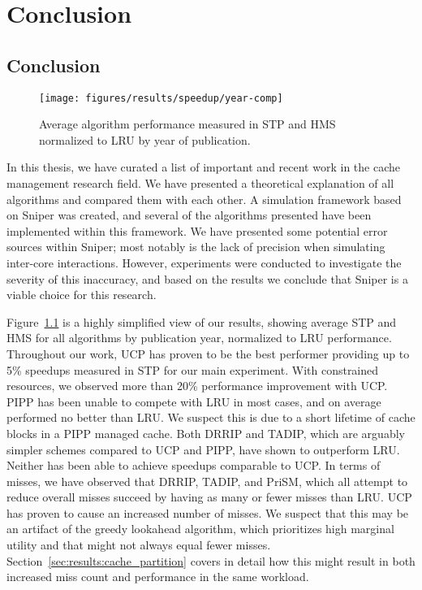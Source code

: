 
\chapter{Conclusion}
\label{cpt:conclusion}

\section{Conclusion}

\begin{figure}[ht]
    \centering
    \texttt{[image: figures/results/speedup/year-comp]}
    \caption[Average algorithm performance by year of publication]{Average algorithm performance measured in STP and HMS normalized to LRU by year of publication.}
    \label{fig:conclusion:yearcomp}
\end{figure}

In this thesis, we have curated a list of important and recent work in the cache management research field.
We have presented a theoretical explanation of all algorithms and compared them with each other.
A simulation framework based on Sniper was created, and several of the algorithms presented have been implemented within this framework.
We have presented some potential error sources within Sniper; most notably is the lack of precision when simulating inter-core interactions.
However, experiments were conducted to investigate the severity of this inaccuracy, and based on the results we conclude that Sniper is a viable choice for this research.

Figure~\ref{fig:conclusion:yearcomp} is a highly simplified view of our results, showing average STP and HMS for all algorithms by publication year, normalized to LRU performance.
Throughout our work, UCP has proven to be the best performer providing up to 5\% speedups measured in STP for our main experiment.
With constrained resources, we observed more than 20\% performance improvement with UCP.
PIPP has been unable to compete with LRU in most cases, and on average performed no better than LRU.
We suspect this is due to a short lifetime of cache blocks in a PIPP managed cache.
Both DRRIP and TADIP, which are arguably simpler schemes compared to UCP and PIPP, have shown to outperform LRU.
Neither has been able to achieve speedups comparable to UCP.
In terms of misses, we have observed that DRRIP, TADIP, and PriSM, which all attempt to reduce overall misses succeed by having as many or fewer misses than LRU.
UCP has proven to cause an increased number of misses.
We suspect that this may be an artifact of the greedy lookahead algorithm, which prioritizes high marginal utility and that might not always equal fewer misses.
Section~\ref{sec:results:cache_partition} covers in detail how this might result in both increased miss count and performance in the same workload.


